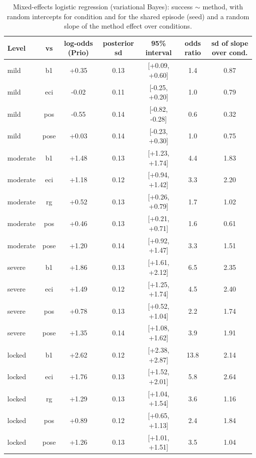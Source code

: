 \begin{table}[t]
\centering
\caption{Mixed-effects logistic regression (variational Bayes): success $\sim$ method, with random intercepts for condition and for the shared episode (seed) and a random slope of the method effect over conditions.}
\label{tab:glmm}
\setlength{\tabcolsep}{3pt}
\begin{tabular}{lcccccc}
\toprule
Level & vs & log-odds (Prio) & posterior sd & 95\% interval & odds ratio & sd of slope over cond. \\
\midrule
mild & b1 & +0.35 & 0.13 & [+0.09, +0.60] & 1.4 & 0.87 \\
mild & eci & -0.02 & 0.11 & [-0.25, +0.20] & 1.0 & 0.79 \\
mild & pos & -0.55 & 0.14 & [-0.82, -0.28] & 0.6 & 0.32 \\
mild & pose & +0.03 & 0.14 & [-0.23, +0.30] & 1.0 & 0.75 \\
moderate & b1 & +1.48 & 0.13 & [+1.23, +1.74] & 4.4 & 1.83 \\
moderate & eci & +1.18 & 0.12 & [+0.94, +1.42] & 3.3 & 2.20 \\
moderate & rg & +0.52 & 0.13 & [+0.26, +0.79] & 1.7 & 1.02 \\
moderate & pos & +0.46 & 0.13 & [+0.21, +0.71] & 1.6 & 0.61 \\
moderate & pose & +1.20 & 0.14 & [+0.92, +1.47] & 3.3 & 1.51 \\
severe & b1 & +1.86 & 0.13 & [+1.61, +2.12] & 6.5 & 2.35 \\
severe & eci & +1.49 & 0.12 & [+1.25, +1.74] & 4.5 & 2.40 \\
severe & pos & +0.78 & 0.13 & [+0.52, +1.04] & 2.2 & 1.74 \\
severe & pose & +1.35 & 0.14 & [+1.08, +1.62] & 3.9 & 1.91 \\
locked & b1 & +2.62 & 0.12 & [+2.38, +2.87] & 13.8 & 2.14 \\
locked & eci & +1.76 & 0.13 & [+1.52, +2.01] & 5.8 & 2.64 \\
locked & rg & +1.29 & 0.13 & [+1.04, +1.54] & 3.6 & 1.16 \\
locked & pos & +0.89 & 0.12 & [+0.65, +1.13] & 2.4 & 1.84 \\
locked & pose & +1.26 & 0.13 & [+1.01, +1.51] & 3.5 & 1.04 \\
\bottomrule
\end{tabular}
\end{table}
